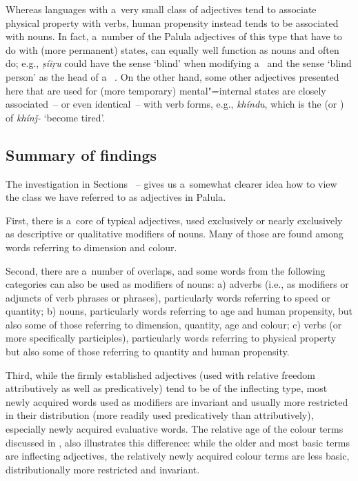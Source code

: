Whereas languages with a~very small class of adjectives tend to associate physical property with verbs, human propensity instead tends to be associated with nouns. In fact, a~number of the Palula adjectives of this type that have to do with (more permanent) states, can equally well function as nouns and often do; e.g., \textit{ṣíiṛu} could have the sense `blind' when modifying a~ and the sense `blind person' as the head of a~ . On the other hand, some other adjectives presented here that are used for (more temporary) mental"=internal states are closely associated~-- or even identical~-- with verb forms, e.g., \textit{khíndu}, which is the  (or ) of \textit{khínǰ-} `become tired'.


\subsection{Summary of findings}
\label{subsec:6-2-9}

The investigation in Sections ~-- gives us a~somewhat clearer idea how to view the class we have referred to as adjectives in Palula. 



First, there is a~core of typical adjectives, used exclusively or nearly exclusively as descriptive or qualitative modifiers of nouns. Many of those are found among words referring to dimension and colour. 



Second, there are a~number of overlaps, and some words from the following categories can also be used as modifiers of nouns: a) adverbs (i.e., as modifiers or adjuncts of verb phrases or  phrases), particularly words referring to speed or quantity; b) nouns, particularly words referring to age and human propensity, but also some of those referring to dimension, quantity, age and colour; c) verbs (or more specifically participles), particularly words referring to physical property but also some of those referring to quantity and human propensity.



Third, while the firmly established adjectives (used with relative freedom attributively as well as predicatively) tend to be of the inflecting type, most newly acquired words used as  modifiers are invariant and usually more restricted in their distribution (more readily used predicatively than attributively), especially newly acquired evaluative words. The relative age of the colour terms discussed in , also illustrates this difference: while the older and most basic terms are inflecting adjectives, the relatively newly acquired colour terms are less basic, distributionally more restricted and invariant.



